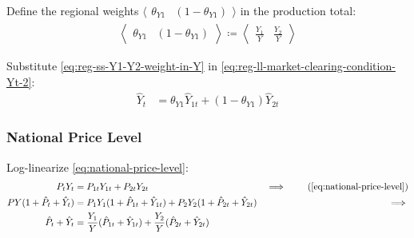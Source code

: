 \documentclass[../thesis.tex]{subfiles}
\begin{document}

Define the regional weights $\langle \begin{smallmatrix} \theta_{Y1} & (1-\theta_{Y1}) \end{smallmatrix} \rangle$ in the production total:
\begin{align}
	\left\langle \begin{matrix} \theta_{Y1} & (1-\theta_{Y1}) \end{matrix} \right\rangle \coloneq \left\langle \begin{matrix} \frac{Y_{1}}{Y} & \frac{Y_{2}}{Y} \end{matrix} \right\rangle \label{eq:reg-ss-Y1-Y2-weight-in-Y}
\end{align}


Substitute \ref{eq:reg-ss-Y1-Y2-weight-in-Y} in \ref{eq:reg-ll-market-clearing-condition-Yt-2}:
\begin{align}
	\hat{Y}_{t} &= \theta_{Y1} \hat{Y}_{1t} + (1-\theta_{Y1}) \hat{Y}_{2t} \label{eq:reg-ll-market-clearing-condition-Yt-3}
\end{align}


\subsubsection*{National Price Level}

Log-linearize \ref{eq:national-price-level}:
\begin{alignat}{2}
	P_{t} Y_{t} &= P_{1t} Y_{1t} + P_{2t} Y_{2t} & \implies \tag{\ref{eq:national-price-level}} \\ 
	P Y (1 + \hat{P}_{t} + \hat{Y}_{t}) &= P_{1} Y_{1} (1 + \hat{P}_{1t} + \hat{Y}_{1t}) + P_{2} Y_{2} (1 + \hat{P}_{2t} + \hat{Y}_{2t}) &\implies \nonumber \\
	\hat{P}_{t} + \hat{Y}_{t} &= \frac{Y_{1}}{Y} (\hat{P}_{1t} + \hat{Y}_{1t}) + \frac{Y_{2}}{Y} (\hat{P}_{2t} + \hat{Y}_{2t}) \label{eq:reg-ll-national-price-level}
\end{alignat}

	
\end{document}
